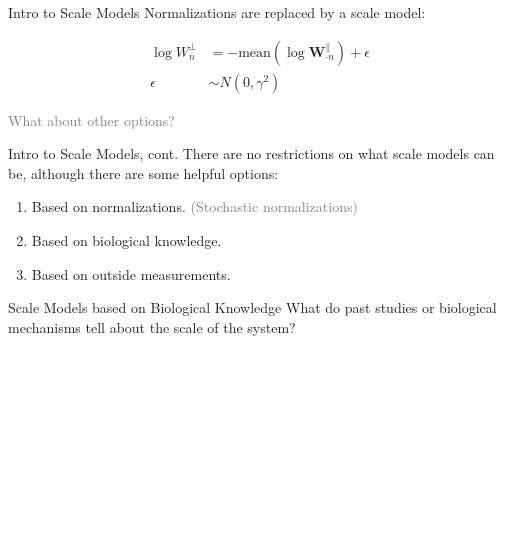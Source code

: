 \documentclass[
  ignorenonframetext,
]{beamer}
\providecommand{\tightlist}{%
  \setlength{\itemsep}{0pt}\setlength{\parskip}{0pt}}
\begin{document}
\begin{frame}{Intro to Scale Models}
\protect\hypertarget{intro-to-scale-models}{}
Normalizations are replaced by a scale model:

\begin{align*}
  \log W_n^\perp &= - \text{mean}(\log \mathbf{W}_{\cdot n}^\parallel) + \epsilon\\
  \epsilon &\sim N(0,\gamma^2)
\end{align*}

\vspace{.25in}

\textcolor{gray}{What about other options?}
\end{frame}

\begin{frame}{Intro to Scale Models, cont.}
\protect\hypertarget{intro-to-scale-models-cont.}{}
There are no restrictions on what scale models can be, although there
are some helpful options:

\begin{enumerate}
\tightlist
\item
  Based on normalizations. \textcolor{gray}{(Stochastic normalizations)}
\item
  Based on biological knowledge.
\item
  Based on outside measurements.
\end{enumerate}
\end{frame}

\begin{frame}{Scale Models based on Biological Knowledge}
\protect\hypertarget{scale-models-based-on-biological-knowledge}{}
What do past studies or biological mechanisms tell about the scale of
the system?

\vspace{.1in}

\textcolor{white}{1. You are confident that taking an antibiotic will kill at least some microbes in the gut.}

\textcolor{white}{2. A past study showed that a certain disease (e.g., Crohn's disease) leads to lower microbial load in the gut.}

\textcolor{white}{3. You believe the total microbial load in the mouth changes after brushing your teeth.}

\textcolor{white}{This type of information can be used in scale model building.}
\end{frame}
\end{document}
